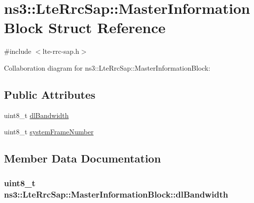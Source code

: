 \hypertarget{structns3_1_1LteRrcSap_1_1MasterInformationBlock}{}\section{ns3\+:\+:Lte\+Rrc\+Sap\+:\+:Master\+Information\+Block Struct Reference}
\label{structns3_1_1LteRrcSap_1_1MasterInformationBlock}


{\ttfamily \#include $<$lte-\/rrc-\/sap.\+h$>$}



Collaboration diagram for ns3\+:\+:Lte\+Rrc\+Sap\+:\+:Master\+Information\+Block\+:
\subsection*{Public Attributes}
\begin{DoxyCompactItemize}
\item 
uint8\+\_\+t \hyperlink{structns3_1_1LteRrcSap_1_1MasterInformationBlock_a1afa3b3425bd8be026923486fad7af8c}{dl\+Bandwidth}
\item 
uint8\+\_\+t \hyperlink{structns3_1_1LteRrcSap_1_1MasterInformationBlock_a916d46a429b91317c9adfdd6f651f059}{system\+Frame\+Number}
\end{DoxyCompactItemize}


\subsection{Member Data Documentation}
\subsubsection[{\texorpdfstring{dl\+Bandwidth}{dlBandwidth}}]{\setlength{\rightskip}{0pt plus 5cm}uint8\+\_\+t ns3\+::\+Lte\+Rrc\+Sap\+::\+Master\+Information\+Block\+::dl\+Bandwidth}\hypertarget{structns3_1_1LteRrcSap_1_1MasterInformationBlock_a1afa3b3425bd8be026923486fad7af8c}{}\label{structns3_1_1LteRrcSap_1_1MasterInformationBlock_a1afa3b3425bd8be026923486fad7af8c}

